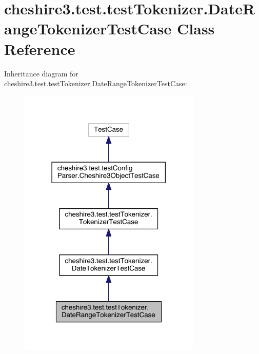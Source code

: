 \hypertarget{classcheshire3_1_1test_1_1test_tokenizer_1_1_date_range_tokenizer_test_case}{\section{cheshire3.\-test.\-test\-Tokenizer.\-Date\-Range\-Tokenizer\-Test\-Case Class Reference}
\label{classcheshire3_1_1test_1_1test_tokenizer_1_1_date_range_tokenizer_test_case}
}


Inheritance diagram for cheshire3.\-test.\-test\-Tokenizer.\-Date\-Range\-Tokenizer\-Test\-Case\-:
\nopagebreak
\begin{figure}[H]
\begin{center}
\leavevmode
\includegraphics[width=246pt]{classcheshire3_1_1test_1_1test_tokenizer_1_1_date_range_tokenizer_test_case__inherit__graph}
\end{center}
\end{figure}



